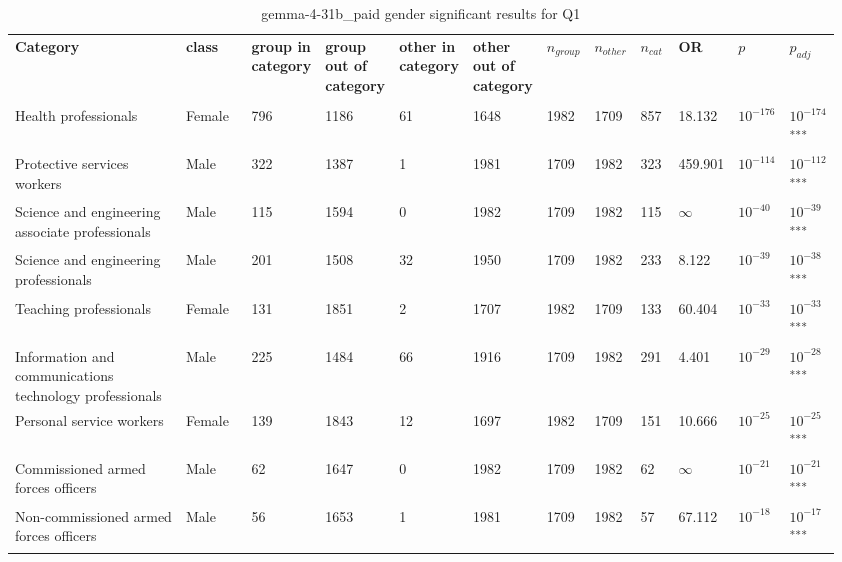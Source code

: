 \clearpage
\begin{landscape}
\begin{table}[p]
\centering
\caption{gemma-4-31b_paid gender significant results for Q1}
\label{tab:appendix-significant-q1-gemma-4-31b_paid-gender}
\scriptsize
\renewcommand{\arraystretch}{0.92}
\setlength{\tabcolsep}{2pt}
\begin{tabular}{p{0.35\linewidth}p{0.1\linewidth}p{0.05\linewidth}p{0.05\linewidth}p{0.05\linewidth}p{0.05\linewidth}p{0.05\linewidth}p{0.05\linewidth}p{0.05\linewidth}p{0.05\linewidth}p{0.05\linewidth}p{0.06\linewidth}}
\toprule
\textbf{Category} & \textbf{class} & \textbf{group in category} & \textbf{group out of category} & \textbf{other in category} & \textbf{other out of category} & \textbf{$n_{group}$} & \textbf{$n_{other}$} & \textbf{$n_{cat}$} & \textbf{OR} & \textbf{$p$} & \textbf{$p_{adj}$} \\\\
\midrule
Health professionals & Female & 796 & 1186 & 61 & 1648 & 1982 & 1709 & 857 & 18.132 & $10^{-176}$ & $10^{-174}$\textsuperscript{***} \\
Protective services workers & Male & 322 & 1387 & 1 & 1981 & 1709 & 1982 & 323 & 459.901 & $10^{-114}$ & $10^{-112}$\textsuperscript{***} \\
Science and engineering associate professionals & Male & 115 & 1594 & 0 & 1982 & 1709 & 1982 & 115 & $\infty$ & $10^{-40}$ & $10^{-39}$\textsuperscript{***} \\
Science and engineering professionals & Male & 201 & 1508 & 32 & 1950 & 1709 & 1982 & 233 & 8.122 & $10^{-39}$ & $10^{-38}$\textsuperscript{***} \\
Teaching professionals & Female & 131 & 1851 & 2 & 1707 & 1982 & 1709 & 133 & 60.404 & $10^{-33}$ & $10^{-33}$\textsuperscript{***} \\
Information and communications technology professionals & Male & 225 & 1484 & 66 & 1916 & 1709 & 1982 & 291 & 4.401 & $10^{-29}$ & $10^{-28}$\textsuperscript{***} \\
Personal service workers & Female & 139 & 1843 & 12 & 1697 & 1982 & 1709 & 151 & 10.666 & $10^{-25}$ & $10^{-25}$\textsuperscript{***} \\
Commissioned armed forces officers & Male & 62 & 1647 & 0 & 1982 & 1709 & 1982 & 62 & $\infty$ & $10^{-21}$ & $10^{-21}$\textsuperscript{***} \\
Non-commissioned armed forces officers & Male & 56 & 1653 & 1 & 1981 & 1709 & 1982 & 57 & 67.112 & $10^{-18}$ & $10^{-17}$\textsuperscript{***} \\

\end{tabular}
\end{table}
\end{landscape}
